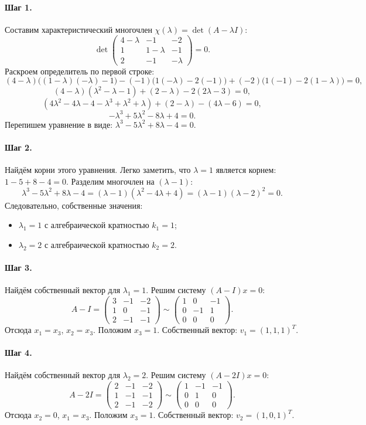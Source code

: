 \documentclass[12pt,a4paper]{article}
\theoremstyle{solution}
\newcommand{\step}[1]{\paragraph{Шаг #1.}}
\begin{document}
\step{1} Составим характеристический многочлен $\chi(\lambda) = \det(A - \lambda I)$:
\[
\det \begin{pmatrix} 4-\lambda & -1 & -2 \\ 1 & 1-\lambda & -1 \\ 2 & -1 & -\lambda \end{pmatrix} = 0.
\]
Раскроем определитель по первой строке:
\[
(4-\lambda) \Big( (1-\lambda)(-\lambda) - 1 \Big) - (-1) \Big( 1(-\lambda) - 2(-1) \Big) + (-2) \Big( 1(-1) - 2(1-\lambda) \Big) = 0,
\]
\[
(4-\lambda)(\lambda^2 - \lambda - 1) + (2 - \lambda) - 2(2\lambda - 3) = 0,
\]
\[
(4\lambda^2 - 4\lambda - 4 - \lambda^3 + \lambda^2 + \lambda) + (2 - \lambda) - (4\lambda - 6) = 0,
\]
\[
-\lambda^3 + 5\lambda^2 - 8\lambda + 4 = 0.
\]
Перепишем уравнение в виде: $\lambda^3 - 5\lambda^2 + 8\lambda - 4 = 0$.

\step{2} Найдём корни этого уравнения. Легко заметить, что $\lambda = 1$ является корнем: $1 - 5 + 8 - 4 = 0$. Разделим многочлен на $(\lambda - 1)$:
\[
\lambda^3 - 5\lambda^2 + 8\lambda - 4 = (\lambda - 1)(\lambda^2 - 4\lambda + 4) = (\lambda - 1)(\lambda - 2)^2 = 0.
\]
Следовательно, собственные значения:
\begin{itemize}
    \item $\lambda_1 = 1$ с алгебраической кратностью $k_1 = 1$;
    \item $\lambda_2 = 2$ с алгебраической кратностью $k_2 = 2$.
\end{itemize}

\step{3} Найдём собственный вектор для $\lambda_1 = 1$. Решим систему $(A - I)x = 0$:
\[
A - I = \begin{pmatrix} 3 & -1 & -2 \\ 1 & 0 & -1 \\ 2 & -1 & -1 \end{pmatrix} \sim \begin{pmatrix} 1 & 0 & -1 \\ 0 & -1 & 1 \\ 0 & 0 & 0 \end{pmatrix}.
\]
Отсюда $x_1 = x_3$, $x_2 = x_3$. Положим $x_3 = 1$. Собственный вектор: $v_1 = (1, 1, 1)^T$.

\step{4} Найдём собственный вектор для $\lambda_2 = 2$. Решим систему $(A - 2I)x = 0$:
\[
A - 2I = \begin{pmatrix} 2 & -1 & -2 \\ 1 & -1 & -1 \\ 2 & -1 & -2 \end{pmatrix} \sim \begin{pmatrix} 1 & -1 & -1 \\ 0 & 1 & 0 \\ 0 & 0 & 0 \end{pmatrix}.
\]
Отсюда $x_2 = 0$, $x_1 = x_3$. Положим $x_3 = 1$. Собственный вектор: $v_2 = (1, 0, 1)^T$.
\end{document}
